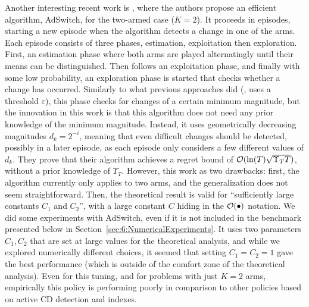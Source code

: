 Another interesting recent work is \cite{AuerGajaneOrtner18}, where the authors propose an efficient algorithm, AdSwitch, for the two-armed case ($K=2$).
It proceeds in episodes, starting a new episode when the algorithm detects a change in one of the arms.
Each episode consists of three phases, estimation, exploitation then exploration.
First, an estimation phase where both arms are played alternatingly until their means can be distinguished.
Then follows an exploitation phase, and finally with some low probability, an exploration phase is started that checks whether a change has occurred.
Similarly to what previous approaches did (\eg, \CUSUM{} uses a threshold $\varepsilon$), this phase checks for changes of a certain minimum magnitude, but the innovation in this work is that this algorithm does not need any prior knowledge of the minimum magnitude.
Instead, it uses geometrically decreasing magnitudes $d_k = 2^{-i}$, meaning that even difficult changes should be detected, possibly in a later episode, as each episode only considers a few different values of $d_k$.
They prove that their algorithm achieves a regret bound of $\mathcal{O}(\ln(T) \sqrt{\Upsilon_T T})$, without a prior knowledge of $\Upsilon_T$.
However, this work as two drawbacks:
first, the algorithm currently only applies to two arms, and the generalization does not seem straightforward.
Then, the theoretical result is valid for ``sufficiently large constants $C_1$ and $C_2$'', with a large constant $C$ hiding in the $\mathcal{O}(\bullet)$ notation.
We did some experiments with AdSwitch, even if it is not included in the benchmark presented below in Section~\ref{sec:6:NumericalExperiments}. It uses two parameters $C_1,C_2$ that are set at large values for the theoretical analysis,
and while we explored numerically different choices, it seemed that setting $C_1=C_2=1$ gave the best performance (which is outside of the comfort zone of the theoretical analysis). Even for this tuning, and for problems with just $K=2$ arms, empirically   this policy is performing poorly in comparison to other policies based on active CD detection and \klUCB{} indexes.


